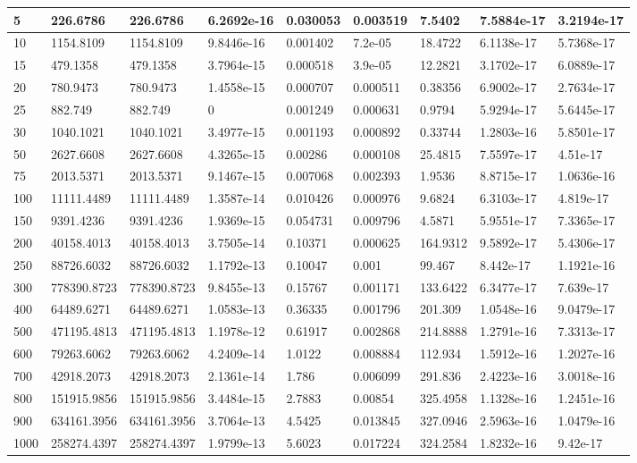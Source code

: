 \begin{tabular}{|l|l|l|l|l|l|l|l|l|}
\hline
5&226.6786&226.6786&6.2692e-16&0.030053&0.003519&7.5402&7.5884e-17&3.2194e-17\\\hline
10&1154.8109&1154.8109&9.8446e-16&0.001402&7.2e-05&18.4722&6.1138e-17&5.7368e-17\\\hline
15&479.1358&479.1358&3.7964e-15&0.000518&3.9e-05&12.2821&3.1702e-17&6.0889e-17\\\hline
20&780.9473&780.9473&1.4558e-15&0.000707&0.000511&0.38356&6.9002e-17&2.7634e-17\\\hline
25&882.749&882.749&0&0.001249&0.000631&0.9794&5.9294e-17&5.6445e-17\\\hline
30&1040.1021&1040.1021&3.4977e-15&0.001193&0.000892&0.33744&1.2803e-16&5.8501e-17\\\hline
50&2627.6608&2627.6608&4.3265e-15&0.00286&0.000108&25.4815&7.5597e-17&4.51e-17\\\hline
75&2013.5371&2013.5371&9.1467e-15&0.007068&0.002393&1.9536&8.8715e-17&1.0636e-16\\\hline
100&11111.4489&11111.4489&1.3587e-14&0.010426&0.000976&9.6824&6.3103e-17&4.819e-17\\\hline
150&9391.4236&9391.4236&1.9369e-15&0.054731&0.009796&4.5871&5.9551e-17&7.3365e-17\\\hline
200&40158.4013&40158.4013&3.7505e-14&0.10371&0.000625&164.9312&9.5892e-17&5.4306e-17\\\hline
250&88726.6032&88726.6032&1.1792e-13&0.10047&0.001&99.467&8.442e-17&1.1921e-16\\\hline
300&778390.8723&778390.8723&9.8455e-13&0.15767&0.001171&133.6422&6.3477e-17&7.639e-17\\\hline
400&64489.6271&64489.6271&1.0583e-13&0.36335&0.001796&201.309&1.0548e-16&9.0479e-17\\\hline
500&471195.4813&471195.4813&1.1978e-12&0.61917&0.002868&214.8888&1.2791e-16&7.3313e-17\\\hline
600&79263.6062&79263.6062&4.2409e-14&1.0122&0.008884&112.934&1.5912e-16&1.2027e-16\\\hline
700&42918.2073&42918.2073&2.1361e-14&1.786&0.006099&291.836&2.4223e-16&3.0018e-16\\\hline
800&151915.9856&151915.9856&3.4484e-15&2.7883&0.00854&325.4958&1.1328e-16&1.2451e-16\\\hline
900&634161.3956&634161.3956&3.7064e-13&4.5425&0.013845&327.0946&2.5963e-16&1.0479e-16\\\hline
1000&258274.4397&258274.4397&1.9799e-13&5.6023&0.017224&324.2584&1.8232e-16&9.42e-17\\\hline
\end{tabular}
